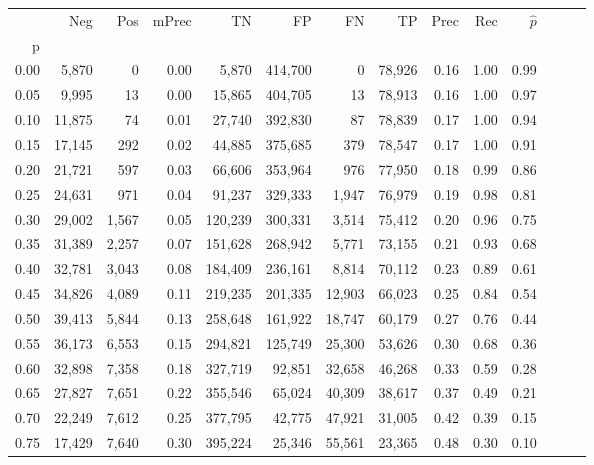 \begin{tabular}{rrrrrrrrrrrrrr}
\toprule
{} &     Neg &    Pos & mPrec &       TN &       FP &      FN &      TP &  Prec &   Rec & $\hat{p}$ \\
p    &         &        &       &          &          &         &         &       &       &           \\
\midrule
0.00 &   5,870 &      0 &  0.00 &    5,870 &  414,700 &       0 &  78,926 &  0.16 &  1.00 &      0.99 \\
0.05 &   9,995 &     13 &  0.00 &   15,865 &  404,705 &      13 &  78,913 &  0.16 &  1.00 &      0.97 \\
0.10 &  11,875 &     74 &  0.01 &   27,740 &  392,830 &      87 &  78,839 &  0.17 &  1.00 &      0.94 \\
0.15 &  17,145 &    292 &  0.02 &   44,885 &  375,685 &     379 &  78,547 &  0.17 &  1.00 &      0.91 \\
0.20 &  21,721 &    597 &  0.03 &   66,606 &  353,964 &     976 &  77,950 &  0.18 &  0.99 &      0.86 \\
0.25 &  24,631 &    971 &  0.04 &   91,237 &  329,333 &   1,947 &  76,979 &  0.19 &  0.98 &      0.81 \\
0.30 &  29,002 &  1,567 &  0.05 &  120,239 &  300,331 &   3,514 &  75,412 &  0.20 &  0.96 &      0.75 \\
0.35 &  31,389 &  2,257 &  0.07 &  151,628 &  268,942 &   5,771 &  73,155 &  0.21 &  0.93 &      0.68 \\
0.40 &  32,781 &  3,043 &  0.08 &  184,409 &  236,161 &   8,814 &  70,112 &  0.23 &  0.89 &      0.61 \\
0.45 &  34,826 &  4,089 &  0.11 &  219,235 &  201,335 &  12,903 &  66,023 &  0.25 &  0.84 &      0.54 \\
0.50 &  39,413 &  5,844 &  0.13 &  258,648 &  161,922 &  18,747 &  60,179 &  0.27 &  0.76 &      0.44 \\
0.55 &  36,173 &  6,553 &  0.15 &  294,821 &  125,749 &  25,300 &  53,626 &  0.30 &  0.68 &      0.36 \\
0.60 &  32,898 &  7,358 &  0.18 &  327,719 &   92,851 &  32,658 &  46,268 &  0.33 &  0.59 &      0.28 \\
0.65 &  27,827 &  7,651 &  0.22 &  355,546 &   65,024 &  40,309 &  38,617 &  0.37 &  0.49 &      0.21 \\
0.70 &  22,249 &  7,612 &  0.25 &  377,795 &   42,775 &  47,921 &  31,005 &  0.42 &  0.39 &      0.15 \\
0.75 &  17,429 &  7,640 &  0.30 &  395,224 &   25,346 &  55,561 &  23,365 &  0.48 &  0.30 &      0.10 \\

\end{tabular}
